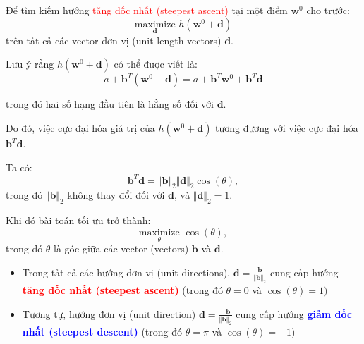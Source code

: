 \documentclass{book}
\begin{document}
Để tìm kiếm hướng \textcolor{red}{tăng dốc nhất (steepest ascent)} tại một điểm $\mathbf{w}^0$ cho trước:
\begin{equation*}
    \underset{\mathbf{d}}{\text{maximize}}\,\,h\left(\mathbf{w}^{0} +  \mathbf{d}\right)
\end{equation*}
trên tất cả các vector đơn vị (unit-length vectors) $\mathbf{d}$.

Lưu ý rằng $h\left(\mathbf{w}^{0} +  \mathbf{d}\right)$ có thể được viết là:
\begin{equation}
    a+\mathbf{b}^T\left(\mathbf{w}^0+\mathbf{d}\right) = a + \mathbf{b}^T\mathbf{w}^0 + \mathbf{b}^T\mathbf{d}
\end{equation}    

trong đó hai số hạng đầu tiên là hằng số đối với $\mathbf{d}$.

Do đó, việc cực đại hóa giá trị của $h\left(\mathbf{w}^{0} +  \mathbf{d}\right)$ tương đương với việc cực đại hóa $\mathbf{b}^T\mathbf{d}$.

Ta có:
\begin{equation*}
    \mathbf{b}^{T}\mathbf{d} = \Vert\mathbf{b}\Vert_2 \Vert\mathbf{d}\Vert_2\cos{(\theta)},
\end{equation*}
trong đó $\Vert\mathbf{b}\Vert_2$ không thay đổi đối với $\mathbf{d}$, và $\Vert\mathbf{d}\Vert_2=1$. 

Khi đó bài toán tối ưu trở thành:
\begin{equation*}
    \underset{\theta}{\text{maximize}}\,\,\cos{(\theta)},
\end{equation*}
trong đó $\theta$ là góc giữa các vector (vectors) $\mathbf{b}$ và $\mathbf{d}$.
\begin{itemize}
    \item Trong tất cả các hướng đơn vị (unit directions), $\mathbf{d}=\frac{\mathbf{b}}{\Vert\mathbf{b}\Vert_2}$ cung cấp hướng \textbf{\textcolor{red}{tăng dốc nhất (steepest ascent)}} (trong đó $\theta=0$ và $\cos{(\theta)}=1)$
    \item Tương tự, hướng đơn vị (unit direction) $\mathbf{d}=\frac{-\mathbf{b}}{\Vert\mathbf{b}\Vert_2}$ cung cấp hướng \textbf{\textcolor{blue}{giảm dốc nhất (steepest descent)}} (trong đó $\theta=\pi$ và $\cos{(\theta)}=-1)$
\end{itemize}
\end{document}

